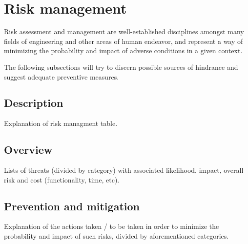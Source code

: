 \section{Risk management}

Risk assessment and management are well-established disciplines amongst many fields of engineering and other areas of human endeavor, and represent a way of minimizing the probability and impact of adverse conditions in a given context.

The following subsections will try to discern possible sources of hindrance and suggest adequate preventive measures.

\subsection{Description}
Explanation of risk managment table.

\subsection{Overview}
Lists of threats (divided by category) with associated likelihood, impact, overall risk and cost (functionality, time, etc).

\subsection{Prevention and mitigation}
Explanation of the actions taken / to be taken in order to minimize the probability and impact of such risks, divided by aforementioned categories.
